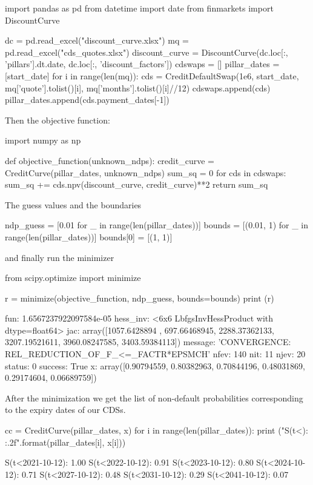 \begin{ipython}
import pandas as pd
from datetime import date
from finmarkets import DiscountCurve

dc = pd.read_excel("discount_curve.xlsx")
mq = pd.read_excel("cds_quotes.xlsx")
discount_curve = DiscountCurve(dc.loc[:, 'pillars'].dt.date,
                               dc.loc[:, 'discount_factors'])
cdswaps = []
pillar_dates = [start_date]
for i in range(len(mq)):
    cds = CreditDefaultSwap(1e6, start_date,
                            mq['quote'].tolist()[i],
                            mq['months'].tolist()[i]//12)
    cdswaps.append(cds)
    pillar_dates.append(cds.payment_dates[-1])
\end{ipython}
\noindent
Then the objective function:
\begin{ipython}
import numpy as np

def objective_function(unknown_ndps):
    credit_curve = CreditCurve(pillar_dates, unknown_ndps)
    sum_sq = 0
    for cds in cdswaps:
        sum_sq += cds.npv(discount_curve, credit_curve)**2
    return sum_sq
\end{ipython}
\noindent
The guess values and the boundaries
\begin{ipython}
ndp_guess = [0.01 for _ in range(len(pillar_dates))]
bounds = [(0.01, 1) for _ in range(len(pillar_dates))]
bounds[0] = [(1, 1)]
\end{ipython}
\noindent
and finally run the minimizer
\begin{ipython}
from scipy.optimize import minimize

r = minimize(objective_function, ndp_guess, bounds=bounds)
print (r)
\end{ipython}
\begin{ioutput}
      fun: 1.6567237922097584e-05
 hess_inv: <6x6 LbfgsInvHessProduct with dtype=float64>
      jac: array([1057.6428894 ,  697.66468945, 2288.37362133, 
                  3207.19521611, 3960.08247585, 3403.59384113])
  message: 'CONVERGENCE: REL_REDUCTION_OF_F_<=_FACTR*EPSMCH'
     nfev: 140
      nit: 11
     njev: 20
   status: 0
  success: True
        x: array([0.90794559, 0.80382963, 0.70844196, 0.48031869, 
                  0.29174604, 0.06689759])
\end{ioutput}

After the minimization we get the list of non-default probabilities corresponding to the expiry dates of our CDSs.

\begin{ipython}
cc = CreditCurve(pillar_dates, x)
for i in range(len(pillar_dates)):
    print ("S(t<{}): {:.2f}".format(pillar_dates[i], x[i]))
\end{ipython}
\begin{ioutput}
S(t<2021-10-12): 1.00
S(t<2022-10-12): 0.91
S(t<2023-10-12): 0.80
S(t<2024-10-12): 0.71
S(t<2027-10-12): 0.48
S(t<2031-10-12): 0.29
S(t<2041-10-12): 0.07
\end{ioutput}

